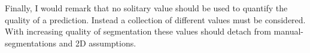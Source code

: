Finally, I would remark that no solitary value should be used to quantify the quality of a prediction. Instead a collection of different values must be considered. With increasing quality of segmentation these values should detach from manual-segmentations and 2D assumptions.\\
